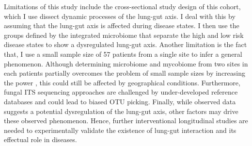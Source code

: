 Limitations of this study include the cross-sectional study design of this cohort, which I use dissect dynamic processes of the lung-gut axis. I deal with this by assuming that the lung-gut axis is affected during disease states. I then use the groups defined by the integrated microbiome that separate the high and low risk disease states to show a dysregulated lung-gut axis. Another limitation is the fact that, I use a small sample size of 57 patients from a single site to infer a general phenomenon. Although determining microbiome and mycobiome from two sites in each patients partially overcomes the problem of small sample sizes by increasing the power \cite{Li2018}, this could still be affected by geographical conditions. Furthermore, fungal ITS sequencing approaches are challenged by under-developed reference databases and could lead to biased OTU picking. Finally, while observed data suggests a potential dysregulation of the lung-gut axis, other factors may drive these observed phenomenon. Hence, further interventional longitudinal studies are needed to experimentally validate the existence of lung-gut interaction and its effectual role in diseases.